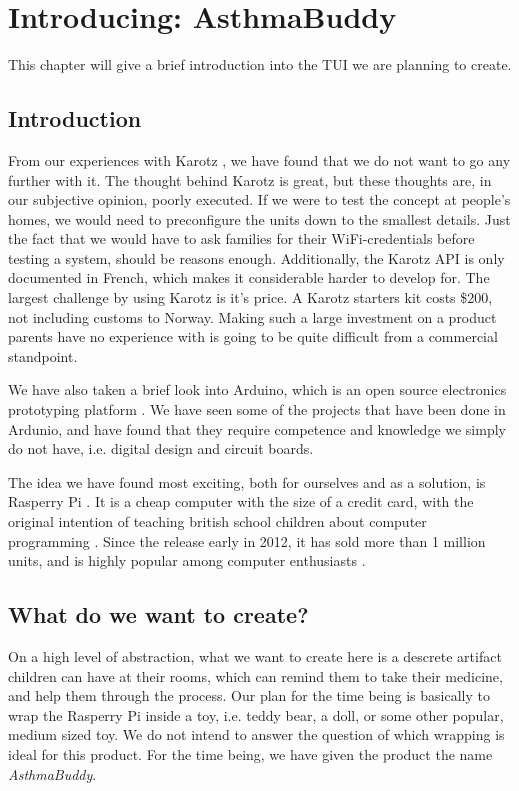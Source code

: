 
\chapter{Introducing: AsthmaBuddy}
\label{chp:our-solution}

This chapter will give a brief introduction into the TUI we are planning to create. 

\section{Introduction}
\label{sec:our-solution-introduction}
From our experiences with Karotz \cite{karotz}, we have found that we do not want to go any further with it. The thought behind Karotz is great, but these thoughts are, in our subjective opinion, poorly executed. If we were to test the concept at people's homes, we would need to preconfigure the units down to the smallest details. Just the fact that we would have to ask families for their WiFi-credentials before testing a system, should be reasons enough.
Additionally, the Karotz API is only documented in French, which makes it considerable harder to develop for. The largest challenge by using Karotz is it's price. A Karotz starters kit costs \$200, not including customs to Norway. Making such a large investment on a product parents have no experience with is going to be quite difficult from a commercial standpoint.  



We have also taken a brief look into Arduino, which is an open source electronics prototyping platform \cite{arduino}. We have seen some of the projects that have been done in Ardunio, and have found that they require competence and knowledge we simply do not have, i.e. digital design and circuit boards. 


The idea we have found most exciting, both for ourselves and as a solution, is Rasperry Pi \cite{rasperrypi}. It is a cheap computer with the size of a credit card, with the original intention of teaching british school children about computer programming \cite{rasperrypi-about}. Since the release early in 2012, it has sold more than 1 million units, and is highly popular among computer enthusiasts \cite{pimillion}. 


\section{What do we want to create?}
On a high level of abstraction, what we want to create here is a descrete artifact children can have at their rooms, which can remind them to take their medicine, and help them through the process. Our plan for the time being is basically to wrap the Rasperry Pi inside a toy, i.e. teddy bear, a doll, or some other popular, medium sized toy. We do not intend to answer the question of which wrapping is ideal for this product. For the time being, we have given the product the name \emph{AsthmaBuddy}. 

